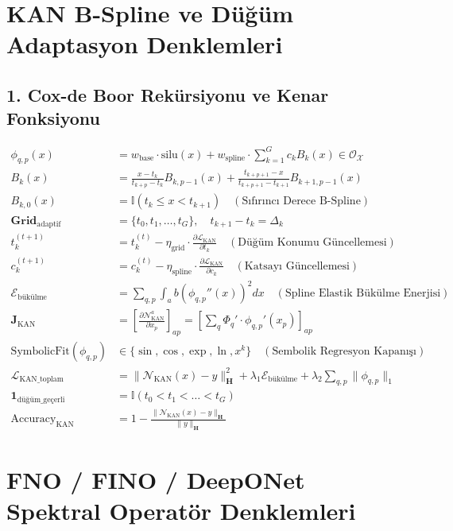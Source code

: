 \documentclass[11pt, a4paper]{article}
\begin{document}
\section{KAN B-Spline ve Düğüm Adaptasyon Denklemleri}

\subsection{1. Cox-de Boor Rekürsiyonu ve Kenar Fonksiyonu}
\begin{align}
\phi_{q,p}(x) &= w_{\text{base}} \cdot \text{silu}(x) + w_{\text{spline}} \cdot \sum_{k=1}^G c_k B_k(x) \in \mathcal{O}_{\mathcal{X}} \\
B_k(x) &= \frac{x - t_k}{t_{k+p} - t_k} B_{k, p-1}(x) + \frac{t_{k+p+1} - x}{t_{k+p+1} - t_{k+1}} B_{k+1, p-1}(x) \\
B_{k, 0}(x) &= \mathbb{I}(t_k \le x < t_{k+1}) \quad (\text{Sıfırıncı Derece B-Spline}) \\
\mathbf{Grid}_{\text{adaptif}} &= \{t_0, t_1, \dots, t_G\}, \quad t_{k+1} - t_k = \Delta_k \\
t_k^{(t+1)} &= t_k^{(t)} - \eta_{\text{grid}} \cdot \frac{\partial \mathcal{L}_{\text{KAN}}}{\partial t_k} \quad (\text{Düğüm Konumu Güncellemesi}) \\
c_k^{(t+1)} &= c_k^{(t)} - \eta_{\text{spline}} \cdot \frac{\partial \mathcal{L}_{\text{KAN}}}{\partial c_k} \quad (\text{Katsayı Güncellemesi}) \\
\mathcal{E}_{\text{bükülme}} &= \sum_{q,p} \int_a b \left( \phi_{q,p}''(x) \right)^2 dx \quad (\text{Spline Elastik Bükülme Enerjisi}) \\
\mathbf{J}_{\text{KAN}} &= \left[ \frac{\partial \mathcal{N}_{\text{KAN}}^a}{\partial x_p} \right]_{ap} = \left[ \sum_q \Phi_q' \cdot \phi_{q,p}'(x_p) \right]_{ap} \\
\text{SymbolicFit}(\phi_{q,p}) &\in \{ \sin, \cos, \exp, \ln, x^k \} \quad (\text{Sembolik Regresyon Kapanışı}) \\
\mathcal{L}_{\text{KAN\_toplam}} &= \|\mathcal{N}_{\text{KAN}}(x) - y\|_{\mathbf{H}}^2 + \lambda_1 \mathcal{E}_{\text{bükülme}} + \lambda_2 \sum_{q,p} \|\phi_{q,p}\|_1 \\
\mathbf{1}_{\text{düğüm\_geçerli}} &= \mathbb{I}\left( t_0 < t_1 < \dots < t_G \right) \\
\text{Accuracy}_{\text{KAN}} &= 1 - \frac{\|\mathcal{N}_{\text{KAN}}(x) - y\|_{\mathbf{H}}}{\|y\|_{\mathbf{H}}}
\end{align}

\section{FNO / FINO / DeepONet Spektral Operatör Denklemleri}
\end{document}
